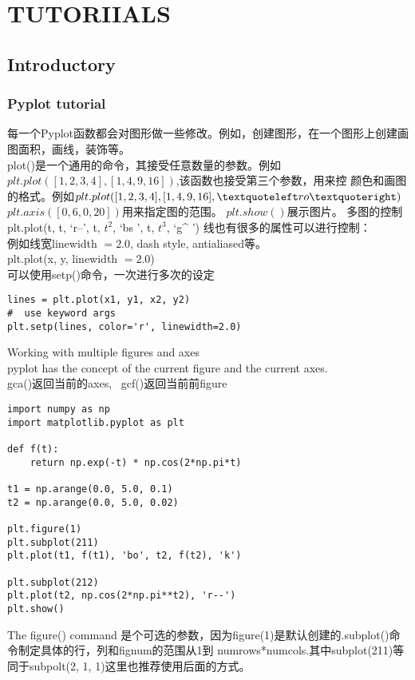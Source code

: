 \chapter{TUTORIIALS}
\section{Introductory}
\subsection{Pyplot tutorial}
每一个Pyplot函数都会对图形做一些修改。例如，创建图形，在一个图形上创建画图面积，画线，装饰等。\\
plot()是一个通用的命令，其接受任意数量的参数。例如$plt.plot([1, 2, 3, 4], [1, 4, 9, 16])$,该函数也接受第三个参数，用来控
颜色和画图的格式。例如$plt.plot([1, 2, 3, 4], [1, 4, 9, 16], \textquoteleft ro \textquoteright)$
$plt.axis([0, 6, 0, 20])$用来指定图的范围。\newline
$plt.show()$展示图片。\newline
多图的控制plt.plot(t, t, \textquoteleft r--\textquoteright, t, $t^{2}$, \textquoteleft bs \textquoteright, t, $t^{3}$, \textquoteleft g\^{} \textquoteright)\newline
线也有很多的属性可以进行控制：\\
例如线宽linewidth $= 2.0$, dash style, antialiased等。\\
plt.plot(x, y, linewidth $= 2.0$)\\
可以使用setp()命令，一次进行多次的设定\\
\begin{verbatim}
lines = plt.plot(x1, y1, x2, y2)
#  use keyword args
plt.setp(lines, color='r', linewidth=2.0)
\end{verbatim}

\noindent{}Working with multiple figures and axes\\
pyplot has the concept of the current figure and the current axes.\\
gca()返回当前的axes,~ gcf()返回当前前figure\\
\begin{lstlisting}
import numpy as np
import matplotlib.pyplot as plt

def f(t):
    return np.exp(-t) * np.cos(2*np.pi*t)

t1 = np.arange(0.0, 5.0, 0.1)
t2 = np.arange(0.0, 5.0, 0.02)

plt.figure(1)
plt.subplot(211)
plt.plot(t1, f(t1), 'bo', t2, f(t2), 'k')

plt.subplot(212)
plt.plot(t2, np.cos(2*np.pi**t2), 'r--')
plt.show()
\end{lstlisting}
The figure() command 是个可选的参数，因为figure(1)是默认创建的.subplot()命令制定具体的行，列和fignum的范围从1到
numrows*numcols.其中subplot(211)等同于subpolt(2, 1, 1)这里也推荐使用后面的方式。


